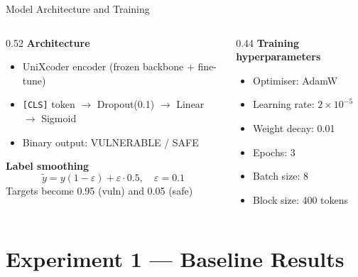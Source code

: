 \documentclass[aspectratio=169]{beamer}
\begin{document}
\begin{frame}{Model Architecture and Training}
  \begin{columns}
    \begin{column}{0.52\textwidth}
      \textbf{Architecture}
      \begin{itemize}
        \item UniXcoder encoder (frozen backbone + fine-tune)
        \item \texttt{[CLS]} token $\to$ Dropout(0.1) $\to$ Linear $\to$ Sigmoid
        \item Binary output: VULNERABLE / SAFE
      \end{itemize}
      \vspace{0.5em}
      \textbf{Label smoothing}
      \[
        \tilde{y} = y(1 - \varepsilon) + \varepsilon \cdot 0.5,\quad \varepsilon = 0.1
      \]
      Targets become 0.95 (vuln) and 0.05 (safe)
    \end{column}
    \begin{column}{0.44\textwidth}
      \textbf{Training hyperparameters}
      \begin{itemize}
        \item Optimiser: AdamW
        \item Learning rate: $2 \times 10^{-5}$
        \item Weight decay: 0.01
        \item Epochs: 3
        \item Batch size: 8
        \item Block size: 400 tokens
      \end{itemize}
    \end{column}
  \end{columns}
\end{frame}

\section{Experiment 1 — Baseline Results}
\end{document}
